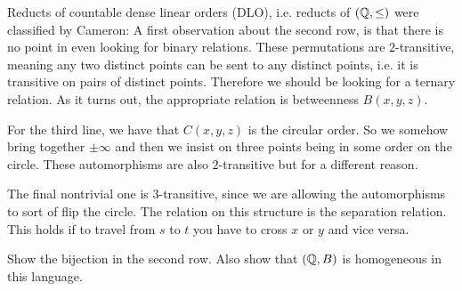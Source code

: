 \documentclass{amsart}
\begin{document}
\begin{exm}
Reducts of countable dense linear orders (DLO), i.e.
reducts of $\left( \mathbb{Q} , \leq \right)$ were classified by Cameron:
A first observation about the second row, is that there is no point in even looking
for binary relations.
These permutations are $2$-transitive, meaning
any two distinct points can be sent to any distinct points, i.e.
it is transitive on pairs of distinct points.
Therefore we should be looking for a ternary relation.
As it turns out, the appropriate relation is betweenness $B\left( x,y,z \right)$.

For the third line, we have that
$C\left( x,y,z \right)$ is the circular order.
So we somehow bring together $\pm \infty$ 
and then we insist on three points being in some order on the circle.
These automorphisms are also $2$-transitive but for a different reason.

The final nontrivial one is $3$-transitive, since we are allowing the automorphisms
to sort of flip the circle.
The relation on this structure is the
separation relation.
This holds if to travel from $s$ to $t$ you have to cross 
$x$ or $y$ and vice versa.
\end{exm}

\begin{exr}
Show the bijection in the second row.
Also show that $\left( \mathbb{Q} , B \right)$ is homogeneous in this language. 
\end{exr}
\end{document}
